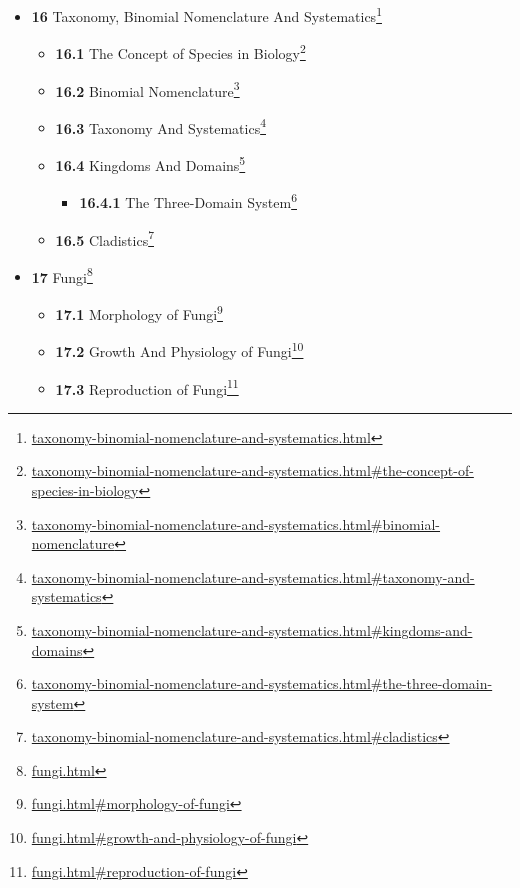 \documentclass[
]{article}
\providecommand{\tightlist}{%
  \setlength{\itemsep}{0pt}\setlength{\parskip}{0pt}}
\providecommand{\tightlist}{%
  \setlength{\itemsep}{0pt}\setlength{\parskip}{0pt}}
\let\rmarkdownfootnote\footnote%
\def\footnote{\protect\rmarkdownfootnote}
\renewcommand{\href}[2]{#2\footnote{\url{#1}}}
\theoremstyle{definition}
\theoremstyle{definition}
\theoremstyle{definition}
\theoremstyle{remark}
\begin{document}
\begin{itemize}
\begin{itemize}
    \begin{itemize}
    \tightlist
    \item
      \href{the-theory-of-evolution-1.html\#adaptation}{\emph{}\textbf{15.4.1}
      Adaptation}
    \item
      \href{the-theory-of-evolution-1.html\#coevolution}{\emph{}\textbf{15.4.2}
      Coevolution}
    \end{itemize}
  \end{itemize}
\item
  \href{taxonomy-binomial-nomenclature-and-systematics.html}{\emph{}\textbf{16}
  Taxonomy, Binomial Nomenclature And Systematics}

  \begin{itemize}
  \tightlist
  \item
    \href{taxonomy-binomial-nomenclature-and-systematics.html\#the-concept-of-species-in-biology}{\emph{}\textbf{16.1}
    The Concept of Species in Biology}
  \item
    \href{taxonomy-binomial-nomenclature-and-systematics.html\#binomial-nomenclature}{\emph{}\textbf{16.2}
    Binomial Nomenclature}
  \item
    \href{taxonomy-binomial-nomenclature-and-systematics.html\#taxonomy-and-systematics}{\emph{}\textbf{16.3}
    Taxonomy And Systematics}
  \item
    \href{taxonomy-binomial-nomenclature-and-systematics.html\#kingdoms-and-domains}{\emph{}\textbf{16.4}
    Kingdoms And Domains}

    \begin{itemize}
    \tightlist
    \item
      \href{taxonomy-binomial-nomenclature-and-systematics.html\#the-three-domain-system}{\emph{}\textbf{16.4.1}
      The Three-Domain System}
    \end{itemize}
  \item
    \href{taxonomy-binomial-nomenclature-and-systematics.html\#cladistics}{\emph{}\textbf{16.5}
    Cladistics}
  \end{itemize}
\item
  \href{fungi.html}{\emph{}\textbf{17} Fungi}

  \begin{itemize}
  \tightlist
  \item
    \href{fungi.html\#morphology-of-fungi}{\emph{}\textbf{17.1}
    Morphology of Fungi}
  \item
    \href{fungi.html\#growth-and-physiology-of-fungi}{\emph{}\textbf{17.2}
    Growth And Physiology of Fungi}
  \item
    \href{fungi.html\#reproduction-of-fungi}{\emph{}\textbf{17.3}
    Reproduction of Fungi}


\end{itemize}
\end{itemize}
\end{document}
